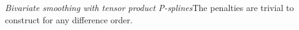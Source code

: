 \begin{frame}{\emph{Bivariate smoothing with tensor product P-splines}}{The penalties are trivial to construct for any difference order.}
\begin{figure}[width = 1.2\textwidth]
\end{figure}

\end{frame}





